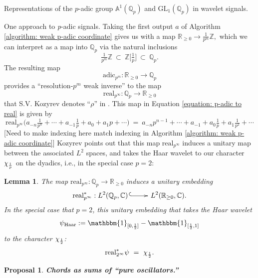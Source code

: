 \documentclass[letterpaper,11pt, reqno]{amsart}
\makeatletter
\newtheorem{monodromy theorem}{Monodromy Theorem}[subsection]
\newtheorem{wild conjecture}[theorem]{Wild Conjecture}
\newtheorem{lemma}[theorem]{Lemma}
\newtheorem{proposal}[theorem]{Proposal}
\newtheorem{research objectives}{Research objectives}[subsection]
\newtheorem{research question}[theorem]{Research questions}
\newtheorem{aside question}[theorem]{Aside question}
\newtheorem{audio example}[theorem]{\loudspeaker[3] Example}
\newtheorem{blank remark}[theorem]{}
\newtheorem{terminology and comment}[theorem]{Terminology and comment}
\newtheorem{purity hypothesis}[theorem]{Purity hypothesis}
\newtheorem{corollary of the purity hypothesis}[theorem]{Corollary of the purity hypothesis}
\newcommand{\CC} {{\mathbb C}}
\newcommand{\QQ} {{\mathbb Q}}
\newcommand{\RR} {{\mathbb R}}
\newcommand{\ZZ} {{\mathbb Z}}
\newcommand{\mono}{\!\xymatrix{{}\ar@{^{(}->}[r]&{}}\!}
\numberwithin{equation}{theorem}
\makeatother
\begin{document}
\begin{section}{Representations of the $p$-adic group $\mathbb{A}^{\!1}(\mathbb{Q}_{p})$
and $\text{GL}_{1}(\mathbb{Q}_{p})$
in wavelet signals.}
\begin{subsection}{One approach to {\em p}-adic signals.}
Taking the first output $a$ of Algorithm \ref{algorithm: weak p-adic coordinate} gives us with a map
	$
	\RR_{\ge0}\longrightarrow\tfrac{1}{p^m}\ZZ,
	$
which we can interpret as a map into $\QQ_{p}$ via the natural inclusions
	$$
	\tfrac{1}{p^m}\ZZ
	\ \subset\ 
	\ZZ\big[\tfrac{1}{p}\big]
	\ \subset\ 
	\QQ_{p}.
	$$
The resulting map
	\begin{equation}\label{equation: weak inverse from algorithm}
	\text{adic}_{p^m}:\RR_{\ge0}\longrightarrow\QQ_p
	\end{equation}
provides a ``resolution-$p^{m}$ weak inverse'' to the map
	\begin{equation}\label{equation: p-adic to real}
	\text{real}_{p^\infty}:\QQ_{p}\longrightarrow\RR_{\ge0}
	\end{equation}
that S.V. Kozyrev denotes ``$\rho$'' in \cite[p. 7, Equation (12)]{Kozyrev}. This map in Equation \eqref{equation: p-adic to real} is given by
	$$
	\text{real}_{p^{\infty\!}}\big(a_{-n}\tfrac{1}{p^{n}}+\cdots+a_{-1}\tfrac{1}{p}+a_0+a_1 p+\cdots\big)
	\ =\ 
	a_{-n}p^{n-1}+\cdots+a_{-1}+a_0\tfrac{1}{p}+a_1\tfrac{1}{p^{2}}+\cdots
	$$
{\color{red} [Need to make indexing here match indexing in Algorithm \ref{algorithm: weak p-adic coordinate}]}
Kozyrev points out that this map $\text{real}_{p^\infty}$ induces a unitary map between the associated $L^2$ spaces, and takes the Haar wavelet to our character $\chi_{\text{{\smaller\smaller\smaller $\tfrac{1}{p}$}}}$ on the dyadics, i.e., in the special case $p=2$:

\begin{lemma}
\normalfont
\cite[Lemmas 5 \& 6]{Kozyrev}
The map $\text{real}_{p^\infty}:\QQ_{p}\longrightarrow\RR_{\ge0}$ induces a unitary embedding
	$$
	\text{real}^\ast_{p^\infty}:L^2(\QQ_{p},\CC)\mono L^2(\RR_{\ge0},\CC).
	$$
In the special case that $p=2$, this unitary embedding
that takes the Haar wavelet $$\psi_{\text{Haar}}:=\mathbbm{1}_{[0,\text{{\smaller\smaller\smaller $\tfrac{1}{2}$}}]}-\mathbbm{1}_{[\text{{\smaller\smaller\smaller $\tfrac{1}{2}$}},1]}$$ to the character $\chi_{\text{{\smaller\smaller\smaller $\tfrac{1}{2}$}}}$:
	$$
	\text{real}^\ast_{2^\infty}\psi
	\ =\ 
	\chi_{\text{{\smaller\smaller\smaller $\tfrac{1}{2}$}}}.
	$$
\end{lemma}


\begin{proposal}\label{proposal: p-adic chords}
{\bf Chords as sums of ``pure oscillators.''}
\normalfont


\end{proposal}
\end{subsection}
\end{section}
\end{document}
